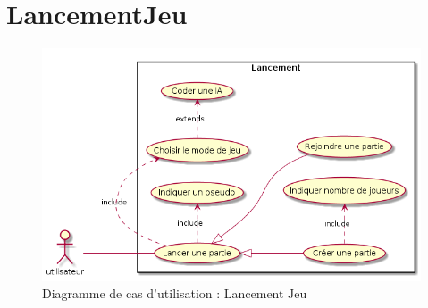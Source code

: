 \section{LancementJeu}
\begin{figure}[h!]%
\centering
	\includegraphics[width=15cm]{images/UML_casUtilisation_LancementJeu.png}%
	\caption{Diagramme de cas d'utilisation : Lancement Jeu}%
	\label{fig:useCase}%
\end{figure}
